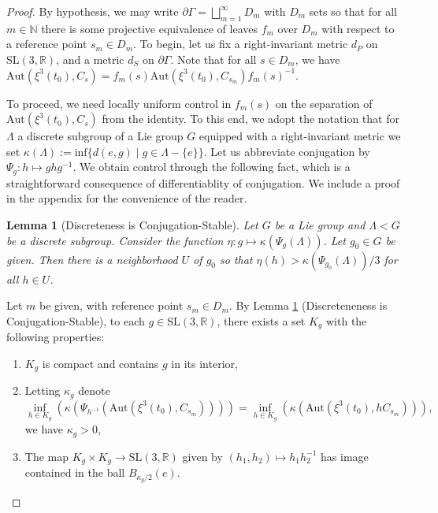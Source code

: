 \documentclass[12pt,a4paper]{amsart}
\newcommand{\bbR}{\mathbb R}
\theoremstyle{definition}
\theoremstyle{plain}
\newtheorem{lemma}[theorem]{Lemma}
\numberwithin{equation}{section}
\begin{document}
\begin{proof}
    By hypothesis, we may write $\partial \Gamma = \bigsqcup_{m=1}^\infty D_m$ with $D_m$ sets so that for all $m \in \mathbb{N}$ there is some projective equivalence of leaves $f_m$ over $D_m$ with respect to a reference point $s_m \in D_m$. To begin, let us fix a right-invariant metric $d_P$ on $\text{SL}(3,\mathbb{R})$, and a metric $d_{S}$ on $\partial \Gamma$. Note that for all $s \in D_m$, we have $\text{Aut}(\xi^3(t_0), C_s) = f_m(s)\text{Aut}(\xi^3(t_0), C_{s_m})f_m(s)^{-1}$.
    
    To proceed, we need locally uniform control in $f_m(s)$ on the separation of $\text{Aut}(\xi^3(t_0), C_s)$ from the identity. To this end, we adopt the notation that for $\Lambda$ a discrete subgroup of a Lie group $G$ equipped with a right-invariant metric we set $\kappa(\Lambda) := \text{inf} \{ d(e,g) \mid g \in \Lambda -\{e\}\}$. Let us abbreviate conjugation by $\Psi_g: h \mapsto gh g^{-1}$. We obtain control through the following fact, which is a straightforward consequence of differentiablity of conjugation. We include a proof in the appendix for the convenience of the reader.
    
    \begin{lemma}[Discreteness is Conjugation-Stable]\label{lemma-discreteness-conjugation-stable}
    Let $G$ be a Lie group and $\Lambda < G$ be a discrete subgroup. Consider the function $\eta: g \mapsto \kappa(\Psi_g(\Lambda))$. Let $g_0 \in G$ be given. Then there is a neighborhood $U$ of $g_0$ so that $\eta(h) > \kappa(\Psi_{g_0}(\Lambda))/3$ for all $h \in U$.
\end{lemma}
    
    Let $m$ be given, with reference point $s_m \in D_m$. By Lemma \ref{lemma-discreteness-conjugation-stable} (Discreteneness is Conjugation-Stable), to each $g \in \text{SL}(3,\bbR)$, there exists a set $K_g$ with the following properties:
    \begin{enumerate}
        \item $K_g$ is compact and contains $g$ in its interior,
        \item Letting $\kappa_g$ denote $\inf\limits_{h \in K_g}(\kappa(\Psi_{h^{-1}}(\text{Aut}(\xi^3(t_0), C_{s_m})))) = \inf\limits_{h\in K_g}(\kappa(\text{Aut}(\xi^3(t_0), hC_{s_m}))),$ we have $\kappa_g > 0$,
        \item The map $K_g \times K_g \to \text{SL}(3,\bbR)$ given by $(h_1,h_2) \mapsto h_1h_2^{-1}$ has image contained in the ball $B_{\kappa_g/2}(e)$.
    \end{enumerate}
    

\end{proof}
\end{document}
